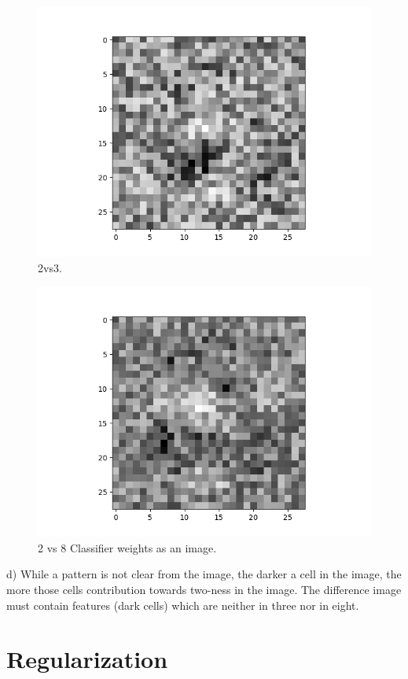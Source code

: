 \documentclass{article} %
\begin{document}
\begin{figure}[h]
\begin{center}
\includegraphics[width=0.8\linewidth]{2vs3.png}
\end{center}
\caption{2vs3.}
\end{figure}

\begin{figure}[h]
\begin{center}
\includegraphics[width=0.8\linewidth]{2vs8.png}
\end{center}
\caption{2 vs 8 Classifier weights as an image.}
\end{figure}
d) While a pattern is not clear from the image, the darker a cell in the image, the more those cells contribution towards two-ness in the image. The difference image must contain features (dark cells) which are neither in three nor in eight.
\section{Regularization}
\end{document}
